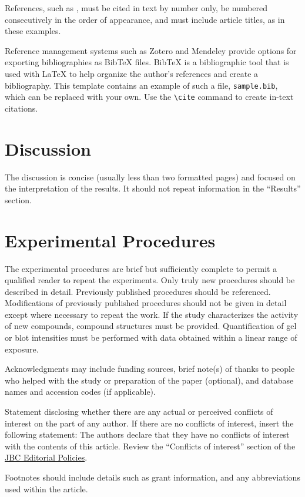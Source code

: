 \documentclass[alpha-refs]{wiley-article}
\begin{document}
References, such as \cite{macdonald1995difference,sambrook1989molecular,waskiewicz1997mitogen,back:etal:2017}, must be cited in text by number only, be numbered consecutively in the order of appearance, and must include article titles, as in these examples. 

Reference management systems such as Zotero and Mendeley provide options for exporting bibliographies as Bib\TeX{} files. Bib\TeX{} is a bibliographic tool that is used with \LaTeX{} to help organize the author's references and create a bibliography. This template contains an example of such a file, \texttt{sample.bib}, which can be replaced with your own. Use the \verb|\cite| command  to create in-text citations.

\section{Discussion}

The discussion is concise (usually less than two formatted pages) and focused on the interpretation of the results. It should not repeat information in the ``Results'' section.

\section{Experimental Procedures}

The experimental procedures are brief but sufficiently complete to permit a qualified reader to repeat the experiments. Only truly new procedures should be described in detail. Previously published procedures should be referenced. Modifications of previously published procedures should not be given in detail except where necessary to repeat the work. If the study characterizes the activity of new compounds, compound structures must be provided. Quantification of gel or blot intensities must be performed with data obtained within a linear range of exposure.

\begin{acknowledgments}
Acknowledgments may include funding sources, brief note(s) of thanks to people who helped with the study or preparation of the paper (optional), and database names and accession codes (if applicable). 
\end{acknowledgments}

\begin{conflict}
Statement disclosing whether there are any actual or perceived conflicts of interest on the part of any author. If there are no conflicts of interest, insert the following statement: The authors declare that they have no conflicts of interest with the contents of this article. Review the “Conflicts of interest” section of the \href{http://www.jbc.org/site/misc/edpolicy.xhtml}{JBC Editorial Policies}.
\end{conflict}




\begin{footnotes}
Footnotes should include details such as grant information, and any abbreviations used within the article.
\end{footnotes}
\end{document}
